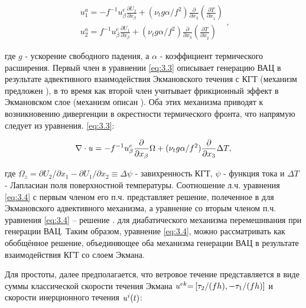\begin{equation} \label{eq:3.3} \begin{array}{l} {u_{1}^{a} =-f^{-1} u_{\beta }^{e} \frac{\partial U_{2} }{\partial x_{\beta } } +(\nu _{t} g\alpha /f^{2} )\frac{\partial }{\partial x_{3} } \left(\frac{\partial T}{\partial x_{1}^{} } \right)} \\ {u_{2}^{a} =f^{-1} u_{\beta }^{e} \frac{\partial U_{1} }{\partial x_{\beta } } +(\nu _{t} g\alpha /f^{2} )\frac{\partial }{\partial x_{3} } \left(\frac{\partial T}{\partial x_{2}^{} } \right)} \end{array},  \end{equation} 



\noindent где $g$ - ускорение свободного падения, а $\alpha $ - коэффициент термического расширения. Первый член в уравнении \eqref{eq:3.3} описывает генерацию ВАЦ в результате адвективного взаимодействия Экмановского течения с КГТ (механизм предложен \citep{Klein1990}), в то время как второй член учитывает фрикционный эффект в Экмановском слое (механизм описан \citep{Garrett1981}). Оба этих механизма приводят к возникновению дивергенции в окрестности термического фронта, что напрямую следует из уравнения. \eqref{eq:3.3}:



\begin{equation} \label{eq:3.4} \nabla \cdot {\it u}=-f^{-1} u_{\beta }^{e} \frac{\partial }{\partial x_{\beta } } \Omega +(\nu _{t} g\alpha /f^{2} )\frac{\partial }{\partial x_{3} } \Delta T,  \end{equation} 



\noindent где $\Omega _{z} =\partial U_{2} /\partial x_{1} -\partial U_{1} /\partial x_{2} \equiv \Delta \psi $ - завихренность КГТ, $\psi $ - функция тока и $\Delta T$ - Лапласиан поля поверхностной температуры. Соотношение л.ч. уравнения \eqref{eq:3.4} с первым членом его п.ч. представляет решение, полеченное в \citep{Klein1990} для Экмановского адвективного механизма, а уравнение со вторым членом п.ч. уравнения \eqref{eq:3.4} -- решение \citep{Garrett1981}. для диабатического механизма перемешивания при генерации ВАЦ. Таким образом, уравнение \eqref{eq:3.4}, можно рассматривать как обобщённое решение, объединяющее оба механизма генерации ВАЦ в результате взаимодействия КГТ со слоем Экмана.

Для простоты, далее предполагается, что ветровое течение представляется в виде суммы классической скорости течения Экмана ${\it u}^{ek} {\it =}\left[\tau _{2} /(fh),-\tau _{1} /(fh)\right]$ и скорости инерционного течения ${\it u}^{i} (t)$:



